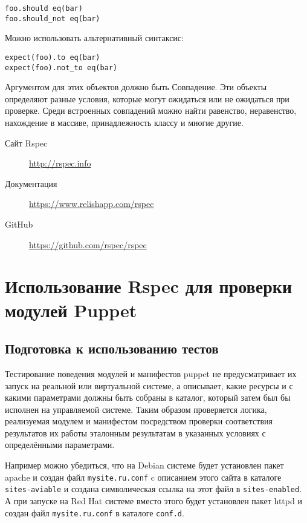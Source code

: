 \begin{verbatim}
foo.should eq(bar)
foo.should_not eq(bar)
\end{verbatim}

Можно использовать альтернативный синтаксис:

\begin{verbatim}
expect(foo).to eq(bar)
expect(foo).not_to eq(bar) 
\end{verbatim}

Аргументом для этих объектов должно быть Совпадение. Эти объекты определяют разные условия, которые могут ожидаться или не ожидаться при проверке. Среди встроенных совпадений можно найти равенство, неравенство, нахождение в массиве, принадлежность классу и многие другие.

\begin{description}
\item[Сайт Rspec] \url{http://rspec.info}
\item[Документация] \url{https://www.relishapp.com/rspec}
\item[GitHub] \url{https://github.com/rspec/rspec}
\end{description}

\section{Использование Rspec для проверки модулей Puppet}

\subsection{Подготовка к использованию тестов}

Тестирование поведения модулей и манифестов puppet не предусматривает их запуск на реальной или виртуальной системе, а описывает, какие ресурсы и с какими параметрами должны быть собраны в каталог, который затем был бы исполнен на управляемой системе. Таким образом проверяется логика, реализуемая модулем и манифестом посредством проверки соответствия результатов их работы эталонным результатам в указанных условиях с определёнными параметрами.

Например можно убедиться, что на Debian системе будет установлен пакет apache и создан файл \texttt{mysite.ru.conf} c описанием этого сайта в каталоге \texttt{sites-aviable}  и создана символическая ссылка на этот файл в \texttt{sites-enabled}. А при запуске на Red Hat системе вместо этого будет установлен пакет httpd и создан файл \texttt{mysite.ru.conf} в каталоге \texttt{conf.d}.

